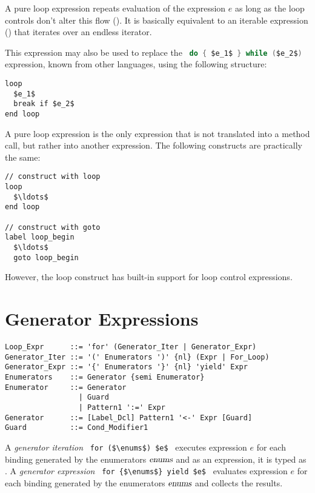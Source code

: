 A pure loop expression repeats evaluation of the expression $e$ as long as the loop controls don't alter this flow (). It is basically equivalent to an iterable expression () that iterates over an endless iterator. 

This expression may also be used to replace the ~\lstinline[language=Java]!do { $e_1$ } while ($e_2$)!~ expression, known from other languages, using the following structure: 
\begin{lstlisting}
loop
  $e_1$
  break if $e_2$
end loop
\end{lstlisting}

A pure loop expression is the only expression that is not translated into a method call, but rather into another expression. The following constructs are practically the same: 
\begin{lstlisting}
// construct with loop
loop
  $\ldots$
end loop

// construct with goto
label loop_begin
  $\ldots$
  goto loop_begin
\end{lstlisting}
However, the loop construct has built-in support for loop control expressions. 





\section{Generator Expressions}
\label{sec:generator-expressions}

\syntax\begin{lstlisting}
Loop_Expr      ::= 'for' (Generator_Iter | Generator_Expr)
Generator_Iter ::= '(' Enumerators ')' {nl} (Expr | For_Loop)
Generator_Expr ::= '{' Enumerators '}' {nl} 'yield' Expr
Enumerators    ::= Generator {semi Enumerator}
Enumerator     ::= Generator
                 | Guard
                 | Pattern1 ':=' Expr
Generator      ::= [Label_Dcl] Pattern1 '<-' Expr [Guard]
Guard          ::= Cond_Modifier1
\end{lstlisting}

A {\em generator iteration} ~\lstinline!for ($\enums$) $e$!~ executes expression $e$ for each binding generated by the enumerators $\mbox{\sl enums}$ and as an expression, it is typed as . A {\em generator expression} ~\lstinline!for {$\enums$} yield $e$!~ evaluates expression $e$ for each binding generated by the enumerators $\mbox{\sl enums}$ and collects the results.

